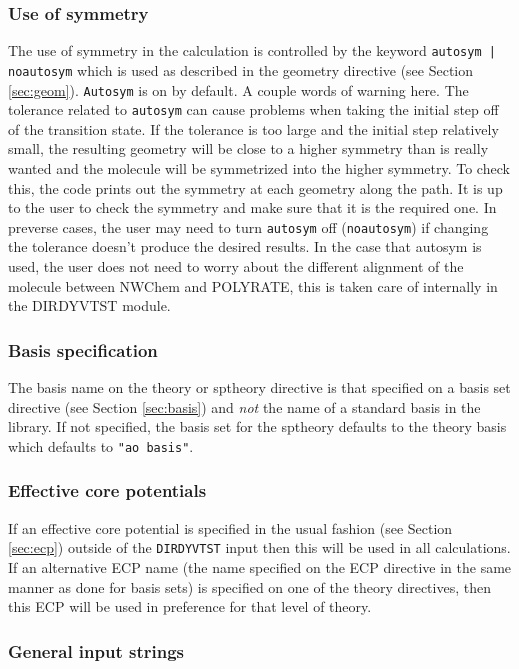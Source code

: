 \subsubsection{Use of symmetry}
The use of symmetry in the calculation is controlled by the keyword
\verb+autosym | noautosym+ which is used as described in the geometry
directive (see Section \ref{sec:geom}).  
\verb+Autosym+ is on by default.  A couple words of warning here.
The tolerance related to \verb+autosym+ can cause problems when taking the
initial step off of the transition state.  If the tolerance is too large and
the initial step relatively small,
the resulting geometry will be close to a higher symmetry than is really 
wanted and the molecule will be symmetrized into the higher symmetry.
To check this, the code prints out the symmetry at each geometry along the 
path.  It is up to the user to check the symmetry and make sure that
it is the required one.  In preverse cases, the user may need to turn
\verb+autosym+ off (\verb+noautosym+) if changing the tolerance doesn't
produce the desired results.  In the case that autosym is used, the
user does not need to worry about the different alignment of the molecule
between NWChem and POLYRATE, this is taken care of internally in the
DIRDYVTST module.

\subsubsection{Basis specification}
The basis name on the theory or sptheory directive is that
specified on a basis set directive (see Section \ref{sec:basis}) and
{\em not} the name of a standard basis in the library.  If not
specified, the basis set for the sptheory defaults to the
theory basis which defaults to \verb+"ao basis"+.  

\subsubsection{Effective core potentials}
If an effective core potential is specified in the usual fashion (see
Section \ref{sec:ecp}) outside of the \verb+DIRDYVTST+ input then this will be
used in all calculations.  If an alternative ECP name (the name
specified on the ECP directive in the same manner as done for basis
sets) is specified on one of the theory directives, then this ECP will
be used in preference for that level of theory.

\subsubsection{General input strings}

